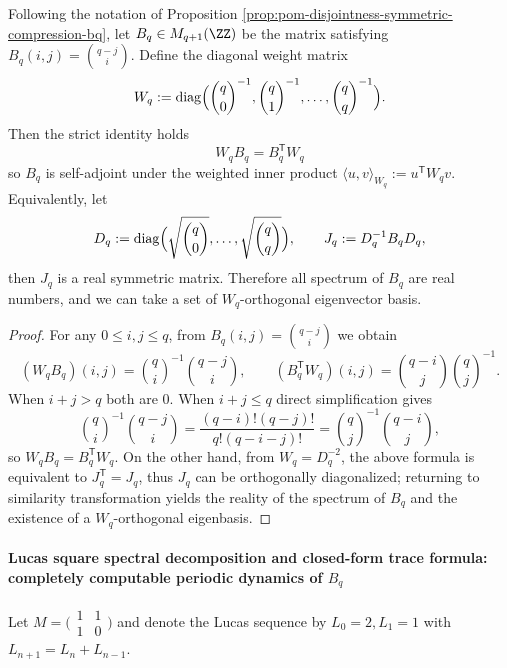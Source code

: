 \begin{proposition}\label{prop:pom-bq-weighted-selfadjoint-binomial}
Following the notation of Proposition \ref{prop:pom-disjointness-symmetric-compression-bq}, let \(B_q\in M_{q+1}(\ZZ)\) be the matrix satisfying \(B_q(i,j)=\binom{q-j}{i}\).
Define the diagonal weight matrix
\[
W_q:=\mathrm{diag}\Bigl(\binom{q}{0}^{-1},\binom{q}{1}^{-1},\dots,\binom{q}{q}^{-1}\Bigr).
\]
Then the strict identity holds
\[
\boxed{\;W_qB_q=B_q^{\mathsf T}W_q\;}
\]
so \(B_q\) is self-adjoint under the weighted inner product \(\langle u,v\rangle_{W_q}:=u^{\mathsf T}W_qv\).
Equivalently, let
\[
D_q:=\mathrm{diag}\Bigl(\sqrt{\binom{q}{0}},\dots,\sqrt{\binom{q}{q}}\Bigr),
\qquad
J_q:=D_q^{-1}B_qD_q,
\]
then \(J_q\) is a real symmetric matrix.
Therefore all spectrum of \(B_q\) are real numbers, and we can take a set of \(W_q\)-orthogonal eigenvector basis.
\end{proposition}
\begin{proof}
For any \(0\le i,j\le q\), from \(B_q(i,j)=\binom{q-j}{i}\) we obtain
\[
(W_qB_q)(i,j)=\binom{q}{i}^{-1}\binom{q-j}{i},
\qquad
(B_q^{\mathsf T}W_q)(i,j)=\binom{q-i}{j}\binom{q}{j}^{-1}.
\]
When \(i+j>q\) both are \(0\).
When \(i+j\le q\) direct simplification gives
\[
\binom{q}{i}^{-1}\binom{q-j}{i}
=\frac{(q-i)!(q-j)!}{q!(q-i-j)!}
=\binom{q}{j}^{-1}\binom{q-i}{j},
\]
so \(W_qB_q=B_q^{\mathsf T}W_q\).
On the other hand, from \(W_q=D_q^{-2}\), the above formula is equivalent to \(J_q^{\mathsf T}=J_q\), thus \(J_q\) can be orthogonally diagonalized; returning to similarity transformation yields the reality of the spectrum of \(B_q\) and the existence of a \(W_q\)-orthogonal eigenbasis.
\end{proof}


\paragraph{Lucas square spectral decomposition and closed-form trace formula: completely computable periodic dynamics of \texorpdfstring{$B_q$}{Bq}}
Let
\(
M=\bigl(\begin{smallmatrix}1&1\\[2pt]1&0\end{smallmatrix}\bigr)
\)
and denote the Lucas sequence by \(L_0=2,L_1=1\) with \(L_{n+1}=L_n+L_{n-1}\).

